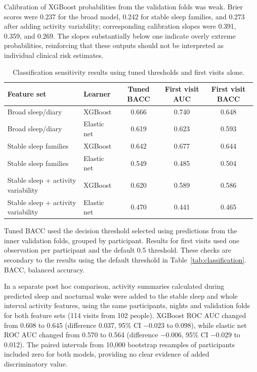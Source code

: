 \documentclass[referee,pdflatex,sn-vancouver-num]{sn-jnl}
\begin{document}
Calibration of XGBoost probabilities from the validation folds was weak.
Brier scores were 0.237 for the
broad model, 0.242 for stable sleep families, and 0.273 after adding activity
variability; corresponding calibration slopes were 0.391, 0.359, and 0.269.
The slopes substantially below one indicate overly extreme probabilities,
reinforcing that these outputs should not be interpreted as individual
clinical risk estimates.

\begin{table}[t]
\caption{Classification sensitivity results using tuned thresholds and first visits alone.}
\label{tab:classification-sensitivity}
\centering
\footnotesize
\begin{tabular}{@{}llccc@{}}
\toprule
Feature set & Learner & Tuned BACC & First visit AUC & First visit BACC \\
\midrule
Broad sleep/diary & XGBoost & 0.666 & 0.740 & 0.648 \\
Broad sleep/diary & Elastic net & 0.619 & 0.623 & 0.593 \\
Stable sleep families & XGBoost & 0.642 & 0.677 & 0.644 \\
Stable sleep families & Elastic net & 0.549 & 0.485 & 0.504 \\
Stable sleep + activity variability & XGBoost & 0.620 & 0.589 & 0.586 \\
Stable sleep + activity variability & Elastic net & 0.470 & 0.441 & 0.465 \\
\bottomrule
\end{tabular}

\medskip
\begin{minipage}{0.96\textwidth}\footnotesize
Tuned BACC used the decision threshold selected using predictions from the
inner validation folds, grouped by participant. Results for first visits used
one observation per participant and the default 0.5 threshold. These checks
are secondary to the results using the default threshold in
Table~\ref{tab:classification}. BACC, balanced accuracy.
\end{minipage}
\end{table}

In a separate post hoc comparison, activity summaries calculated during predicted
sleep and nocturnal wake were added to the stable sleep and whole interval
activity features, using the same participants, nights and validation folds
for both feature sets (114 visits from 102 people). XGBoost ROC AUC changed
from 0.608 to 0.645 (difference 0.037, 95\% CI $-0.023$ to 0.098), while
elastic net ROC AUC changed from 0.570 to 0.564 (difference $-0.006$, 95\% CI
$-0.029$ to 0.012). The paired intervals from 10,000 bootstrap resamples of
participants included zero for both models, providing no clear evidence of
added discriminatory value.
\end{document}
